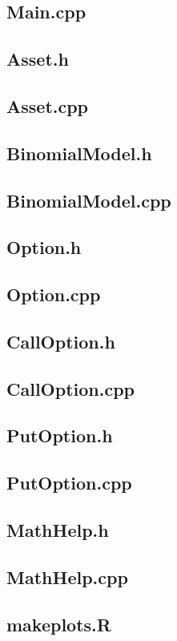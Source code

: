 \documentclass[12pt]{article}
\begin{document}
\subsection{Main.cpp}


\subsection{Asset.h}

\subsection{Asset.cpp}


\subsection{BinomialModel.h}

\subsection{BinomialModel.cpp}


\subsection{Option.h}

\subsection{Option.cpp}


\subsection{CallOption.h}

\subsection{CallOption.cpp}


\subsection{PutOption.h}

\subsection{PutOption.cpp}


\subsection{MathHelp.h}

\subsection{MathHelp.cpp}



\subsection{makeplots.R}

\end{document}
